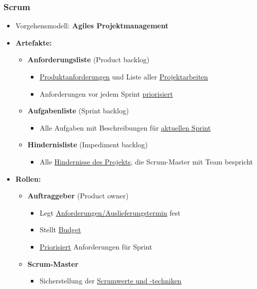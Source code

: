 \documentclass[parskip=full, 12pt]{scrartcl}
\begin{document}
			\newpage
			\subsubsection{Scrum}
			
				\begin{itemize}
					\item Vorgehensmodell: \textbf{Agiles Projektmanagement}
					\item \textbf{Artefakte:}
					\begin{itemize}
						\item \textbf{Anforderungsliste} (Product backlog)
						\begin{itemize}
							\item \underline{Produktanforderungen} und Liste aller \underline{Projektarbeiten}
							\item Anforderungen vor jedem Sprint \underline{priorisiert}
						\end{itemize}
						\item \textbf{Aufgabenliste} (Sprint backlog)
						\begin{itemize}
							\item Alle Aufgaben mit Beschreibungen für \underline{aktuellen Sprint}
						\end{itemize}
						\item \textbf{Hindernisliste} (Impediment backlog)
						\begin{itemize}
							\item Alle \underline{Hindernisse des Projekts}, die Scrum-Master mit Team bespricht
						\end{itemize}
					\end{itemize}
					\item \textbf{Rollen:}
					\begin{itemize}
						\item \textbf{Auftraggeber} (Product owner)
						\begin{itemize}
							\item Legt \underline{Anforderungen/Auslieferungstermin} fest
							\item Stellt \underline{Budget}
							\item \underline{Priorisiert} Anforderungen für Sprint
						\end{itemize}
						\item \textbf{Scrum-Master}
						\begin{itemize}
							\item Sicherstellung der \underline{Scrumwerte und -techniken}

\end{itemize}
\end{itemize}
\end{itemize}
\end{document}

